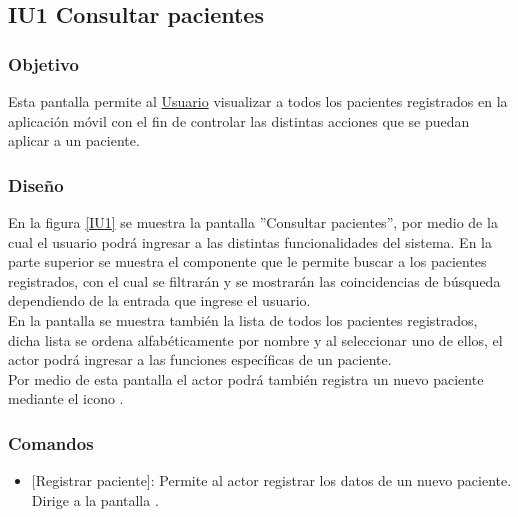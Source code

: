 \subsection{IU1 Consultar pacientes}

\subsubsection{Objetivo}
	
Esta pantalla permite al \hyperlink{actor:usuario}{Usuario} visualizar a todos los pacientes registrados en la aplicación móvil con el fin de controlar las distintas acciones que se puedan aplicar a un paciente.

\subsubsection{Diseño}
En la figura \ref{IU1} se muestra la pantalla ''Consultar pacientes'', por medio de la cual el usuario podrá ingresar a las distintas funcionalidades del sistema. En la parte superior se muestra el componente que le permite buscar a los pacientes registrados, con el cual se filtrarán y se mostrarán las coincidencias de búsqueda dependiendo de la entrada que ingrese el usuario.\\

En la pantalla se muestra también la lista de todos los pacientes registrados, dicha lista se ordena alfabéticamente por nombre y al seleccionar uno de ellos, el actor podrá ingresar a las funciones específicas de un paciente.\\

Por medio de esta pantalla el actor podrá también registra un nuevo paciente mediante el icono \btnRegistro{}.

    

\subsubsection{Comandos}
	\begin{itemize}
		\item \btnRegistro{} [Registrar paciente]: Permite al actor registrar los datos de un nuevo paciente. Dirige a la pantalla .
	\end{itemize}
\clearpage